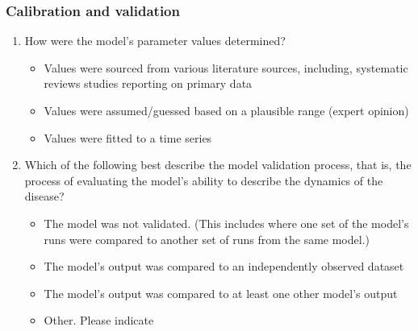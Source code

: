 \documentclass[10pt,a4paper]{article}
\begin{document}
	\subsubsection{Calibration and validation}
	\begin{enumerate}[resume]
		\item How were the model’s parameter values determined? 
		\begin{itemize}
			\item Values were sourced from various literature sources, including, systematic reviews studies reporting on primary data
			\item Values were assumed/guessed based on a plausible range (expert opinion)
			\item Values were fitted to a time series 
		\end{itemize}
		\item Which of the following best describe the model validation process, that is, the process of evaluating the model’s ability to describe the dynamics of the disease?
		\begin{itemize}
			\item The model was not validated. (This includes where one set of the model’s runs were compared to another set of runs from the same model.)
			\item The model's output was compared to an independently observed dataset
			\item The model's output was compared to at least one other model's output
			\item Other. Please indicate
		\end{itemize}
	\end{enumerate}
	
\end{document}
